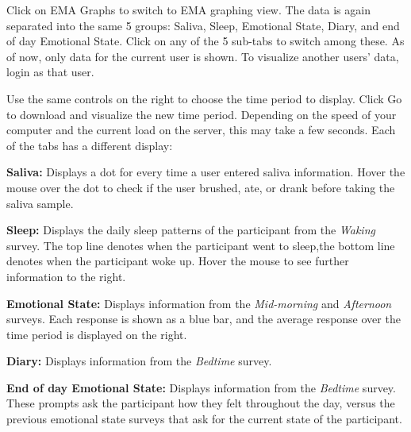 \documentclass{article}
\begin{document}
Click on EMA Graphs to switch to EMA graphing view.  The data is again separated into the same 5 groups: Saliva,
Sleep, Emotional State, Diary, and end of day Emotional State.  Click on any of the 5 sub-tabs to switch among these.
As of now, only data for the current user is shown.  To visualize another users' data, login as that user.

Use the same controls on the right to choose the time period to display.  Click Go to download and visualize
the new time period.  Depending on the speed of your computer and the current load on the server, this may
take a few seconds.   Each of the tabs has a different display:

{\bf Saliva:} Displays a dot for every time a user entered saliva information.  Hover the mouse over the dot
	to check if the user brushed, ate, or drank before taking the saliva sample.

{\bf Sleep:} Displays the daily sleep patterns of the participant from the \emph{Waking} survey.  The top line denotes when the participant
	went to sleep,the bottom line denotes when the participant woke up.  Hover the mouse to see further information
	to the right.

{\bf Emotional State:} Displays information from the \emph{Mid-morning} and \emph{Afternoon} surveys.  Each response
	is shown as a blue bar, and the average response over the time period is displayed on the right.

{\bf Diary:} Displays information from the \emph{Bedtime} survey.

{\bf End of day Emotional State:} Displays information from the \emph{Bedtime} survey.  These prompts ask the participant
	how they felt throughout the day, versus the previous emotional state surveys that ask for the current state of the participant.
\end{document}
